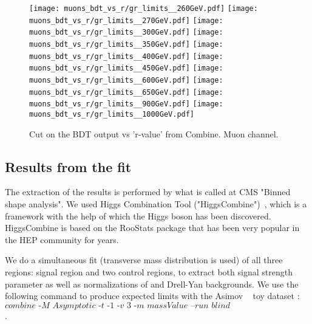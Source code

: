 \begin{figure}[!htb]%
\texttt{[image: muons\_bdt\_vs\_r/gr\_limits\_\_260GeV.pdf]}
\texttt{[image: muons\_bdt\_vs\_r/gr\_limits\_\_270GeV.pdf]}
\texttt{[image: muons\_bdt\_vs\_r/gr\_limits\_\_300GeV.pdf]}
\texttt{[image: muons\_bdt\_vs\_r/gr\_limits\_\_350GeV.pdf]}
\texttt{[image: muons\_bdt\_vs\_r/gr\_limits\_\_400GeV.pdf]}
\texttt{[image: muons\_bdt\_vs\_r/gr\_limits\_\_450GeV.pdf]}
\texttt{[image: muons\_bdt\_vs\_r/gr\_limits\_\_600GeV.pdf]}
\texttt{[image: muons\_bdt\_vs\_r/gr\_limits\_\_650GeV.pdf]}
\texttt{[image: muons\_bdt\_vs\_r/gr\_limits\_\_900GeV.pdf]}
\hspace{1.9cm}
\texttt{[image: muons\_bdt\_vs\_r/gr\_limits\_\_1000GeV.pdf]}
\caption{ Cut on the BDT output vs 'r-value' from Combine. Muon channel.}
\label{fig:muon_bdt_vs_r}           
\end{figure}

 
\subsection{Results from the fit}
The extraction of the results is performed by what is called at CMS "Binned shape analysis". We used Higgs Combination Tool ("HiggsCombine")~\cite{HiggsCombine}, which is a framework with the help of which the Higgs boson has been discovered. HiggsCombine is based on the RooStats package that has been very popular in the HEP community for years. 

We do a simultaneous fit (\mTHH transverse mass distribution is used) of all three
regions: signal region and two control regions, to extract both
signal strength parameter as well as normalizations of \ttbar and
Drell-Yan backgrounds. We use the following command to produce expected limits with the Asimov ~\cite{Cowan:2010js} toy dataset :  \hfill \break
$\textit{combine 
-M Asymptotic -t -1 -v 3 -m massValue --run blind
comb\_card\_massValue.txt}$.





